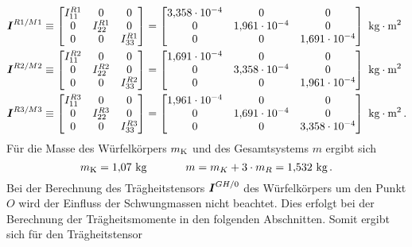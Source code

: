 \begin{equation}
\begin{split}
\boldsymbol{I}^{R1/M1} &\equiv \begin{bmatrix}
I^{R1}_{\text{11}} & 0 & 0 \\ 0 & I^{R1}_{\text{22}} & 0 \\ 0 & 0 & I^{R1}_{\text{33}}
\end{bmatrix} = 
\begin{bmatrix}
3{,}358\cdot 10^{-4} & 0 & 0 \\
0 & 1{,}961\cdot 10^{-4} & 0 \\
0 & 0 & 1{,}691\cdot 10^{-4}
\end{bmatrix} \text{ kg}\cdot \text{m}^2
\\
\boldsymbol{I}^{R2/M2} &\equiv \begin{bmatrix}
I^{R2}_{\text{11}} & 0 & 0 \\ 0 & I^{R2}_{\text{22}} & 0 \\ 0 & 0 & I^{R2}_{\text{33}}
\end{bmatrix} = 
\begin{bmatrix}
1{,}691\cdot 10^{-4} & 0 & 0 \\
0 & 3{,}358\cdot 10^{-4} & 0 \\
0 & 0 & 1{,}961\cdot 10^{-4}
\end{bmatrix} \text{ kg}\cdot \text{m}^2
\\
\boldsymbol{I}^{R3/M3} &\equiv \begin{bmatrix}
I^{R3}_{\text{11}} & 0 & 0 \\ 0 & I^{R3}_{\text{22}} & 0 \\ 0 & 0 & I^{R3}_{\text{33}}
\end{bmatrix} = 
\begin{bmatrix}
1{,}961\cdot 10^{-4} & 0 & 0 \\
0 & 1{,}691\cdot 10^{-4} & 0 \\
0 & 0 & 3{,}358\cdot 10^{-4}
\end{bmatrix} \text{ kg}\cdot \text{m}^2 \,.
\end{split}
\end{equation}
Für die Masse des Würfelkörpers $m_{\text{K}}$ und des Gesamtsystems $m$ ergibt sich
\begin{equation}
m_{\text{K}} = 1{,}07 \text{ kg} \hspace{35pt} m = m_K + 3\cdot m_R = 1{,}532 \text{ kg}\,.
\end{equation}
Bei der Berechnung des Trägheitstensors $\boldsymbol{I}^{GH/0}$ des Würfelkörpers um den Punkt $O$ wird der Einfluss der Schwungmassen nicht beachtet. Dies erfolgt bei der Berechnung der Trägheitsmomente in den folgenden Abschnitten. Somit ergibt sich für den Trägheitstensor
